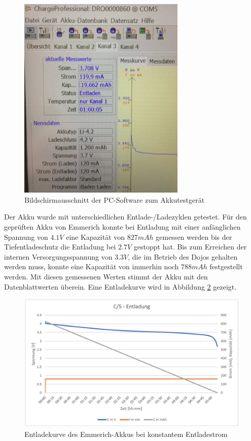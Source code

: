 \begin{figure}[htp]
	\centering
	\includegraphics[width=8cm]{Bilder/ChargeProfessional.JPG}
	 \caption{Bildschirmausschnitt der PC-Software zum Akkutestgerät}
	 \label{fig:ChargeProfessional}
\end{figure}

Der Akku wurde mit unterschiedlichen Entlade-/Ladezyklen getestet. Für den geprüften Akku von Emmerich konnte bei Entladung mit einer anfänglichen Spannung von $4.1V$ eine Kapazität von $827mAh$ gemessen werden bis der Tiefentladeschutz die Entladung bei $2.7V$ gestoppt hat. Bis zum Erreichen der internen Versorgungsspannung von $3.3V$, die im Betrieb des Dojos gehalten werden muss, konnte eine Kapazität von immerhin noch $788mAh$ festgestellt werden. Mit diesen gemessenen Werten stimmt der Akku mit den Datenblattwerten überein. Eine Entladekurve wird in Abbildung \ref{fig:Entladekurve} gezeigt.\\

\begin{figure}[htp]
	\centering
	\includegraphics[width=15cm]{Bilder/Entladekurve.JPG}
	 \caption{Entladekurve des Emmerich-Akkus bei konstantem Entladestrom}
	 \label{fig:Entladekurve}
\end{figure}


